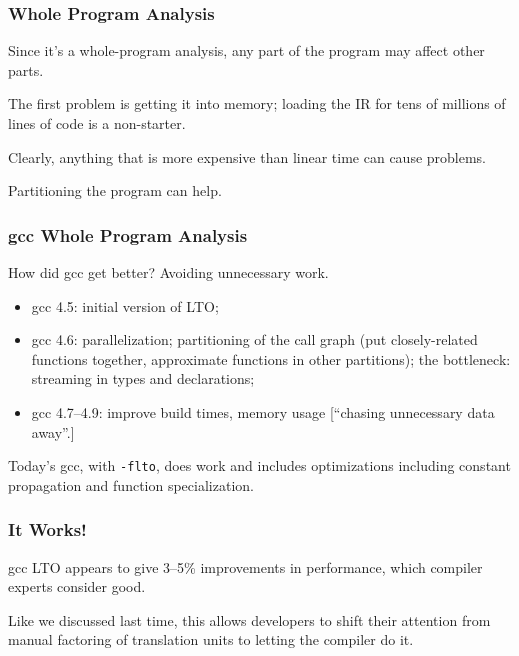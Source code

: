 \begin{frame}
\frametitle{Whole Program Analysis}


Since it's a whole-program analysis, any part of the program may affect other parts. 

The first problem
is getting it into memory; loading the IR for tens of millions of lines of code is a non-starter.


Clearly, anything that is more expensive than linear time can cause problems. 

Partitioning the program can help.

\end{frame}


\begin{frame}
\frametitle{gcc Whole Program Analysis}

How did gcc get better?  Avoiding unnecessary work.

\begin{itemize}
\item gcc 4.5: initial version of LTO;
\item gcc 4.6: parallelization; partitioning of the call graph (put closely-related functions together, approximate functions in other partitions); the bottleneck: streaming in types and declarations;
\item gcc 4.7--4.9: improve build times, memory usage [``chasing unnecessary data away''.]
\end{itemize}

Today's gcc, with {\tt -flto}, does work and includes
optimizations including constant propagation and function
specialization.


\end{frame}


\begin{frame}
\frametitle{It Works!}

gcc LTO appears to give 3--5\% improvements in performance, which compiler experts consider good.


Like we discussed last time, this allows developers to shift their attention from 
manual factoring of translation units to letting the compiler do it.

\end{frame}







